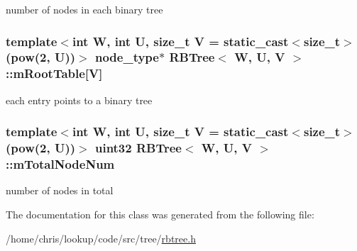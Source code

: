 number of nodes in each binary tree 

\hypertarget{classRBTree_afa0e7bbf323151a0d0047a31452c09e2}{
\subsubsection[{m\-Root\-Table}]{\setlength{\rightskip}{0pt plus 5cm}template$<$int W, int U, size\-\_\-t V = static\-\_\-cast$<$size\-\_\-t$>$(pow(2, U))$>$ {\bf node\-\_\-type}$\ast$ {\bf R\-B\-Tree}$<$ {\bf W}, U, V $>$\-::m\-Root\-Table\mbox{[}V\mbox{]}\hspace{0.3cm}{\ttfamily [private]}}}\label{classRBTree_afa0e7bbf323151a0d0047a31452c09e2}


each entry points to a binary tree 

\hypertarget{classRBTree_aa14705d97172b233354c4308df69f8f6}{
\subsubsection[{m\-Total\-Node\-Num}]{\setlength{\rightskip}{0pt plus 5cm}template$<$int W, int U, size\-\_\-t V = static\-\_\-cast$<$size\-\_\-t$>$(pow(2, U))$>$ {\bf uint32} {\bf R\-B\-Tree}$<$ {\bf W}, U, V $>$\-::m\-Total\-Node\-Num\hspace{0.3cm}{\ttfamily [private]}}}\label{classRBTree_aa14705d97172b233354c4308df69f8f6}


number of nodes in total 



The documentation for this class was generated from the following file\-:\begin{DoxyCompactItemize}
\item 
/home/chris/lookup/code/src/tree/\hyperlink{rbtree_8h}{rbtree.\-h}\end{DoxyCompactItemize}

